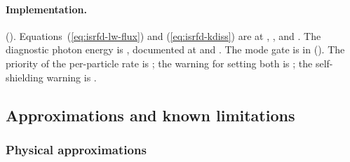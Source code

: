 \paragraph{Implementation.}
(). Equations~(\ref{eq:isrfd-lw-flux}) and
(\ref{eq:isrfd-kdiss}) are at , ,
 and . The diagnostic photon energy is
, documented at
 and .
The mode gate is  in
(). The priority of the per-particle rate
is ; the warning for setting both is
; the self-shielding warning is
.

\subsection{Approximations and known limitations}
\label{sec:isrf-eqdisc-limits}

\subsubsection{Physical approximations}

